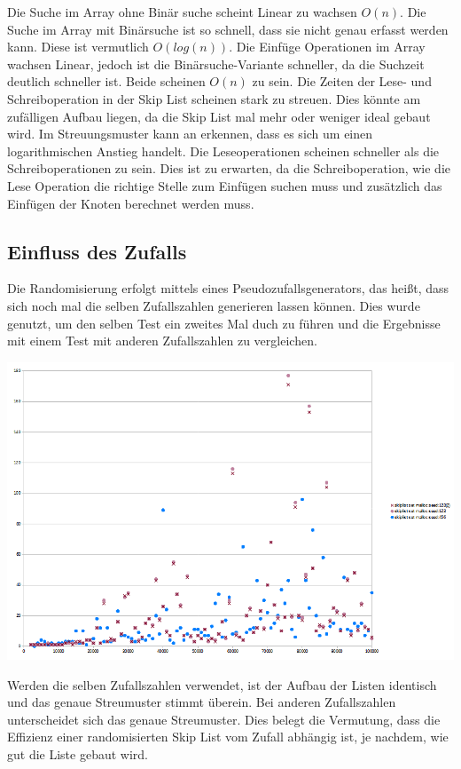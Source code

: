 \documentclass{TUBAFarbeiten}
\begin{document}
Die Suche im Array ohne Binär suche scheint Linear zu wachsen \(O(n)\). Die Suche im Array mit Binärsuche ist so schnell, dass sie nicht genau erfasst werden kann. Diese ist vermutlich \(O(log(n))\). Die Einfüge Operationen im Array wachsen Linear, jedoch ist die Binärsuche-Variante schneller, da die Suchzeit deutlich schneller ist. Beide scheinen \(O(n)\) zu sein.
Die Zeiten der Lese- und Schreiboperation in der Skip List scheinen stark zu streuen. Dies könnte am zufälligen Aufbau liegen, da die Skip List mal mehr oder weniger ideal gebaut wird. Im Streuungsmuster kann an erkennen, dass es sich um einen logarithmischen Anstieg handelt. Die Leseoperationen scheinen schneller als die Schreiboperationen zu sein. Dies ist zu erwarten, da die Schreiboperation, wie die Lese Operation die richtige Stelle zum Einfügen suchen muss und zusätzlich das Einfügen der Knoten berechnet werden muss.

\subsection{Einfluss des Zufalls}

Die Randomisierung erfolgt mittels eines Pseudozufallsgenerators, das heißt, dass sich noch mal die selben Zufallszahlen generieren lassen können. Dies wurde genutzt, um den selben Test ein zweites Mal duch zu führen und die Ergebnisse mit einem Test mit anderen Zufallszahlen zu vergleichen.

\includegraphics[scale=0.55]{img/diagram_skiplist_seeds}
\label{fig:Img6}

Werden die selben Zufallszahlen verwendet, ist der Aufbau der Listen identisch und das genaue Streumuster stimmt überein. Bei anderen Zufallszahlen unterscheidet sich das genaue Streumuster. Dies belegt die Vermutung, dass die Effizienz einer randomisierten Skip List vom Zufall abhängig ist, je nachdem, wie gut die Liste gebaut wird.
\end{document}
